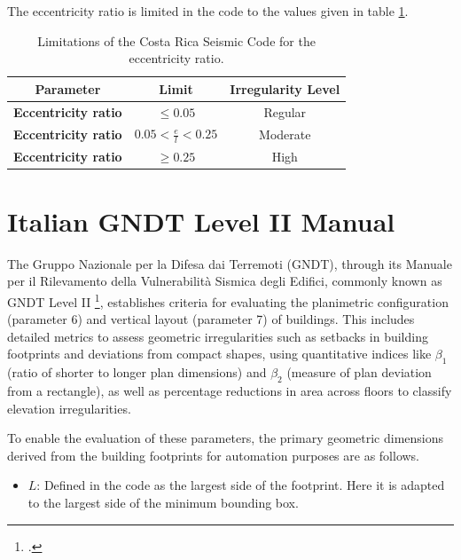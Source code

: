 \begin{refsection}
The eccentricity ratio is limited in the code to the values given in table \ref{tab:CR_limits}. 

\begin{table}[h]
    \centering
    \caption{Limitations of the Costa Rica Seismic Code for the eccentricity ratio.}
    \begin{tabular}{|c|c|c|}
        \hline
        \textbf{Parameter} & \textbf{Limit} & \textbf{Irregularity Level}\\
        \hline
        \textbf{Eccentricity ratio} & $\leq 0.05$ & Regular\\
        \hline
        \textbf{Eccentricity ratio}  & $0.05 < \frac{e}{l} < 0.25$ & Moderate \\
        \hline
        \textbf{Eccentricity ratio}  & $\ge 0.25$ & High \\
        \hline
    \end{tabular}
    \label{tab:CR_limits}
\end{table}


\renewcommand{\sectionnametext}{Italian GNDT Level II Manual}
\renewcommand{\headingtextR}{\thesection. \sectionnametext}
\section{\sectionnametext}

The Gruppo Nazionale per la Difesa dai Terremoti (GNDT), through its Manuale per il Rilevamento della Vulnerabilità Sismica degli Edifici, commonly known as GNDT Level II \footcite{gndt_gruppo_nazionale_per_la_difesa_dai_terremoti_schede_1994}, establishes criteria for evaluating the planimetric configuration (parameter 6) and vertical layout (parameter 7) of buildings. This includes detailed metrics to assess geometric irregularities such as setbacks in building footprints and deviations from compact shapes, using quantitative indices like $\beta_1$ (ratio of shorter to longer plan dimensions) and $\beta_2$ (measure of plan deviation from a rectangle), as well as percentage reductions in area across floors to classify elevation irregularities. 


To enable the evaluation of these parameters, the primary geometric dimensions derived from the building footprints for automation purposes are as follows.
\begin{itemize}
\item $L$: Defined in the code as the largest side of the footprint. Here it is adapted to the largest side of the minimum bounding box.


\end{itemize}
\end{refsection}
